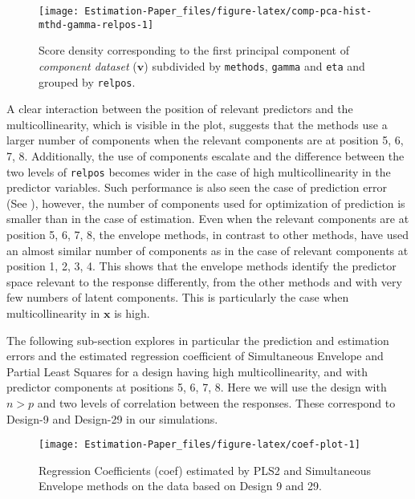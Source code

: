 \documentclass[12pt,3p,authoryear]{elsarticle}
\begin{document}
\begin{figure}[!htb]
\texttt{[image: Estimation-Paper\_files/figure-latex/comp-pca-hist-mthd-gamma-relpos-1]} \caption{Score density corresponding to the first principal component of \emph{component dataset} (\(\mathbf{v}\)) subdivided by \texttt{methods}, \texttt{gamma} and \texttt{eta} and grouped by \texttt{relpos}.}\label{fig:comp-pca-hist-mthd-gamma-relpos}
\end{figure}

A clear interaction between the position of relevant predictors and the multicollinearity, which is visible in the plot, suggests that the methods use a larger number of components when the relevant components are at position 5, 6, 7, 8. Additionally, the use of components escalate and the difference between the two levels of \texttt{relpos} becomes wider in the case of high multicollinearity in the predictor variables. Such performance is also seen the case of prediction error (See \citet{rimal2019pred}), however, the number of components used for optimization of prediction is smaller than in the case of estimation. Even when the relevant components are at position 5, 6, 7, 8, the envelope methods, in contrast to other methods, have used an almost similar number of components as in the case of relevant components at position 1, 2, 3, 4. This shows that the envelope methods identify the predictor space relevant to the response differently, from the other methods and with very few numbers of latent components. This is particularly the case when multicollinearity in \(\mathbf{x}\) is high.

The following sub-section explores in particular the prediction and estimation errors and the estimated regression coefficient of Simultaneous Envelope and Partial Least Squares for a design having high multicollinearity, and with predictor components at positions 5, 6, 7, 8. Here we will use the design with \(n>p\) and two levels of correlation between the responses. These correspond to Design-9 and Design-29 in our simulations.

\begin{figure}
\texttt{[image: Estimation-Paper\_files/figure-latex/coef-plot-1]} \caption{Regression Coefficients (coef) estimated by PLS2 and Simultaneous Envelope methods on the data based on Design 9 and 29.}\label{fig:coef-plot}
\end{figure}
\end{document}
